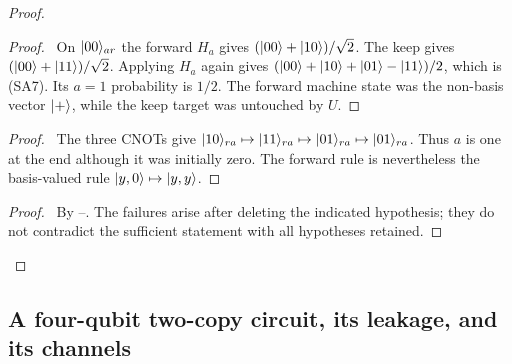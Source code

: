 \begin{proof}
 \begin{proof}\pf\ On $\lvert 00\rangle_{ar}$ the forward $H_a$ gives
 $(\lvert 00\rangle+\lvert 10\rangle)/\sqrt2$. The keep gives
 $(\lvert 00\rangle+\lvert 11\rangle)/\sqrt2$. Applying $H_a$ again gives
 $(\lvert 00\rangle+\lvert 10\rangle+\lvert 01\rangle-\lvert 11\rangle)/2$, which is (SA7).
 Its $a=1$ probability is $1/2$. The forward machine state was the
 non-basis vector $\lvert +\rangle$, while the keep target was untouched by $U$.
 \end{proof}
 \begin{proof}\pf\ The three CNOTs give
 $\lvert 10\rangle_{ra}\mapsto\lvert 11\rangle_{ra}\mapsto\lvert 01\rangle_{ra}
 \mapsto\lvert 01\rangle_{ra}$. Thus $a$ is one at the end although it
 was initially zero. The forward rule is nevertheless the
 basis-valued rule $\lvert y,0\rangle\mapsto\lvert y,y\rangle$.
 \end{proof}
 \qedstep
 \begin{proof}\pf\ By --.
 The failures arise after deleting the indicated hypothesis; they do
 not contradict the sufficient statement with all hypotheses retained.
 \end{proof}
\end{proof}

\subsection{A four-qubit two-copy circuit, its leakage, and its channels}

